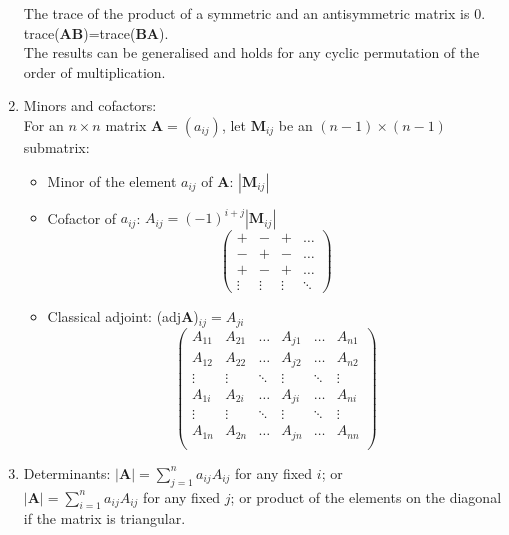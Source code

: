 \documentclass[fleqn]{article}
\begin{document}
\begin{enumerate}
        The trace of the product of a symmetric and an antisymmetric matrix is 0.\\
        trace($\bm{AB}$)=trace($\bm{BA}$).\\
        The results can be generalised and holds for any cyclic permutation of the order of multiplication.
    \item Minors and cofactors:\\
        For an $n\times n$ matrix $\bm{A}=(a_{ij})$, let $\bm{M}_{ij}$ be an $(n-1)\times(n-1)$ submatrix:
        \begin{itemize}[noitemsep, topsep=0pt]
            \item Minor of the element $a_{ij}$ of $\bm{A}$: $|\bm{M}_{ij}|$
            \item Cofactor of $a_{ij}$: $A_{ij}=(-1)^{i+j}|\bm{M}_{ij}|$
                \[\begin{pmatrix}
                    + & - & + & \dots \\
                    - & + & - & \dots \\
                    + & - & + & \dots \\
                    \vdots & \vdots & \vdots & \ddots
                \end{pmatrix}\]
            \item Classical adjoint: (adj$\bm{A}$)$_{ij}=A_{ji}$
                \[\begin{pmatrix}
                    A_{11} & A_{21} & \dots  & A_{j1} & \dots  & A_{n1}\\
                    A_{12} & A_{22} & \dots  & A_{j2} & \dots  & A_{n2}\\
                    \vdots & \vdots & \ddots & \vdots & \ddots & \vdots\\
                    A_{1i} & A_{2i} & \dots  & A_{ji} & \dots  & A_{ni}\\
                    \vdots & \vdots & \ddots & \vdots & \ddots & \vdots\\
                    A_{1n} & A_{2n} & \dots  & A_{jn} & \dots  & A_{nn}\\
                \end{pmatrix}\]
        \end{itemize}
    \item Determinants:\smallbreak
        $|\bm{A}|=\displaystyle\sum_{j=1}^n a_{ij}A_{ij}$ for any fixed $i$; or\\
        $|\bm{A}|=\displaystyle\sum_{i=1}^n a_{ij}A_{ij}$ for any fixed $j$; or\smallbreak
        product of the elements on the diagonal if the matrix is triangular.

\end{enumerate}
\end{document}
